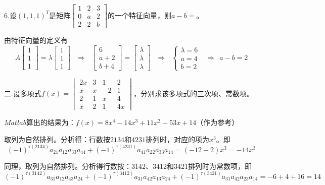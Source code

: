 \documentclass{article}
\begin{document}
6.设$(1,1,1)^{T}$是矩阵$
\begin{bmatrix}
  1 & 2 & 3 \\
  0 & a & 2\\
  2 & 2 & b
\end{bmatrix}
$的一个特征向量，则$a-b=$\underline{\hphantom{~~~~~~~~~~}}。

\begin{jie}
由特征向量的定义有
\begin{equation*}
A
\begin{bmatrix}
1\\ 1\\ 1
\end{bmatrix}=\lambda
\begin{bmatrix}
1\\ 1\\ 1
\end{bmatrix}~~~\Rightarrow~~~
\begin{bmatrix}
6\\ a+2\\ b+4
\end{bmatrix}=\begin{bmatrix}
\lambda\\ \lambda\\ \lambda
\end{bmatrix}~~~\Rightarrow~~~
\begin{cases}
\lambda=6\\
a=4\\
b=2
\end{cases}~~~\Rightarrow~~a-b=2
\end{equation*}
\end{jie}

二.设多项式$
f(x)=
\begin{vmatrix}
  2x & 3 & 1 & 2\\
  x & x & -2 & 1\\
  2 & 1 & x & 4\\
  x & 2 & 1 & 4x
\end{vmatrix}
$，分别求该多项式的三次项、常数项。

\begin{jie}
$Matlab$算出的结果为：$f(x)=8x^{4}-14x^3+11x^2-53x+14$（作为参考）

取列为自然排列。分析得：行数按$2134$和$4231$排列时，对应的项为$x^3$。即
\begin{equation*}
(-1)^{\tau(2134)}a_{21}a_{12}a_{33}a_{44}+(-1)^{\tau(4231)}a_{41}a_{22}a_{33}a_{14}=(-12-2)x^{3}=-14x^3
\end{equation*}

同理，取列为自然排列。分析得行数按：$3142$、$3412$和$3421$排列时为常数项，即
\begin{equation*}
(-1)^{\tau(3142)}a_{31}a_{12}a_{43}a_{24}+(-1)^{\tau(3412)}a_{31}a_{42}a_{13}a_{24}+(-1)^{\tau(3421)}a_{31}a_{42}a_{23}a_{14}=-6+4+16=14
\end{equation*}
\end{jie}
\end{document}
